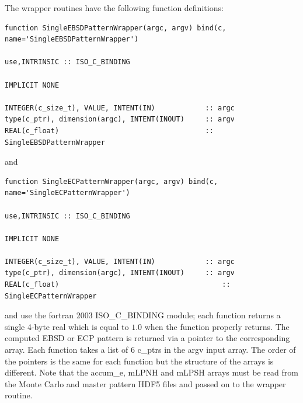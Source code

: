 \documentclass[DIV=calc, paper=letter, fontsize=11pt]{scrartcl}	 %
\begin{document}
The wrapper routines have the following function definitions:
\begin{verbatim}
function SingleEBSDPatternWrapper(argc, argv) bind(c, name='SingleEBSDPatternWrapper') 

use,INTRINSIC :: ISO_C_BINDING

IMPLICIT NONE

INTEGER(c_size_t), VALUE, INTENT(IN)            :: argc 
type(c_ptr), dimension(argc), INTENT(INOUT)     :: argv
REAL(c_float)                                   :: SingleEBSDPatternWrapper
\end{verbatim}
and
\begin{verbatim}
function SingleECPatternWrapper(argc, argv) bind(c, name='SingleECPatternWrapper') 
	
use,INTRINSIC :: ISO_C_BINDING

IMPLICIT NONE

INTEGER(c_size_t), VALUE, INTENT(IN)            :: argc 
type(c_ptr), dimension(argc), INTENT(INOUT)     :: argv
REAL(c_float)                                  		:: SingleECPatternWrapper
\end{verbatim}
and use the fortran 2003 \textsf{ISO\_C\_BINDING} module; each function returns a single 4-byte real which is equal to $1.0$ when the 
function properly returns.  The computed 
EBSD or ECP pattern is returned via a pointer to the corresponding array.  Each function takes a list of $6$ \textsf{c\_ptr}s
in the \textsf{argv} input array.  The order of the pointers is the same for each function but the structure of the arrays is different.  Note that
the \textsf{accum\_e}, \textsf{mLPNH} and \textsf{mLPSH} arrays must be read from the Monte Carlo and master pattern HDF5 files and
passed on to the wrapper routine. 
\end{document}
